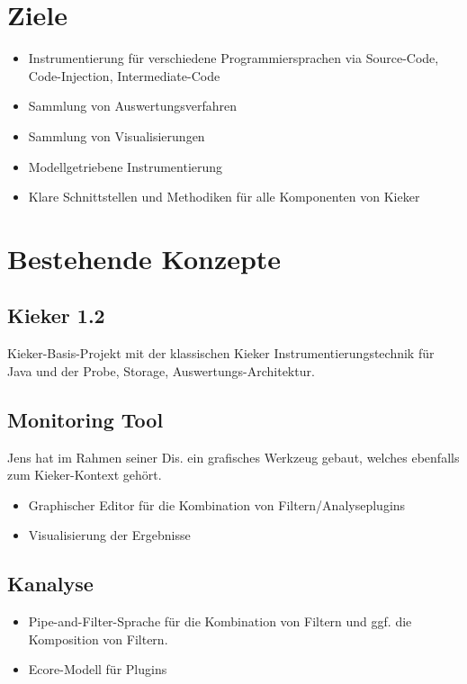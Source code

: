 

\section{Ziele}

\begin{itemize}
\item Instrumentierung für verschiedene Programmiersprachen via Source-Code, Code-Injection, Intermediate-Code
\item Sammlung von Auswertungsverfahren
\item Sammlung von Visualisierungen
\item Modellgetriebene Instrumentierung
\item Klare Schnittstellen und Methodiken für alle Komponenten von Kieker
\end{itemize}

\section{Bestehende Konzepte}

%
\subsection{Kieker 1.2}

Kieker-Basis-Projekt mit der klassischen Kieker Instrumentierungstechnik für Java und der Probe, Storage, Auswertungs-Architektur.

%
\subsection{Monitoring Tool}

Jens hat im Rahmen seiner Dis. ein grafisches Werkzeug gebaut, welches ebenfalls zum Kieker-Kontext gehört.

\begin{itemize}
\item Graphischer Editor für die Kombination von Filtern/Analyseplugins
\item Visualisierung der Ergebnisse
\end{itemize}

%
\subsection{Kanalyse}

\begin{itemize}
\item Pipe-and-Filter-Sprache für die Kombination von Filtern und ggf. die Komposition von Filtern.
\item Ecore-Modell für Plugins
\end{itemize}

